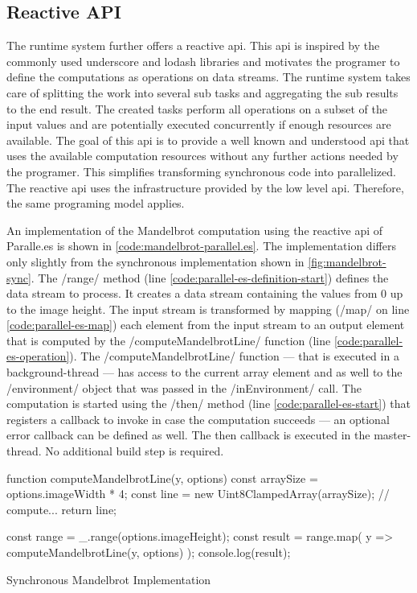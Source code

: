 \subsection{Reactive API}
The runtime system further offers a reactive api. This api is inspired by the commonly used underscore and lodash libraries and motivates the programer to define the computations as operations on data streams. The runtime system takes care of splitting the work into several sub tasks and aggregating the sub results to the end result. The created tasks perform all operations on a subset of the input values and are potentially executed concurrently if enough resources are available. The goal of this api is to provide a well known and understood api that uses the available computation resources without any further actions needed by the programer. This simplifies transforming synchronous code into parallelized. The reactive api uses the infrastructure provided by the low level api. Therefore, the same programing model applies.


 An implementation of the Mandelbrot computation using the reactive api of Paralle.es is shown in \cref{code:mandelbrot-parallel.es}. The implementation differs only slightly from the synchronous implementation shown in \cref{fig:mandelbrot-sync}. The \javascriptinline/range/ method (line \ref{code:parallel-es-definition-start}) defines the data stream to process. It creates a data stream containing the values from 0 up to the image height. The input stream is transformed by mapping (\javascriptinline/map/ on line \ref{code:parallel-es-map}) each element from the input stream to an output element that is computed by the \javascriptinline/computeMandelbrotLine/ function (line \ref{code:parallel-es-operation}). The \javascriptinline/computeMandelbrotLine/ function --- that is executed in a background-thread --- has access to the current array element and as well to the \javascriptinline/environment/ object that was passed in the \javascriptinline/inEnvironment/ call. The computation is started using the \javascriptinline/then/ method (line \ref{code:parallel-es-start}) that registers a callback to invoke in case the computation succeeds --- an optional error callback can be defined as well. The then callback is executed in the master-thread.  No additional build step is required.

\begin{listing}
	
	\begin{javascriptcode}
function computeMandelbrotLine(y, options) {
	const arraySize = options.imageWidth * 4;
	const line = new Uint8ClampedArray(arraySize);
	// compute...
	return line;
}

const range = _.range(options.imageHeight);
const result = range.map(
	y => computeMandelbrotLine(y, options)
);
console.log(result);
\end{javascriptcode}
\caption{Synchronous Mandelbrot Implementation}
\label{fig:mandelbrot-sync}
\end{listing}

